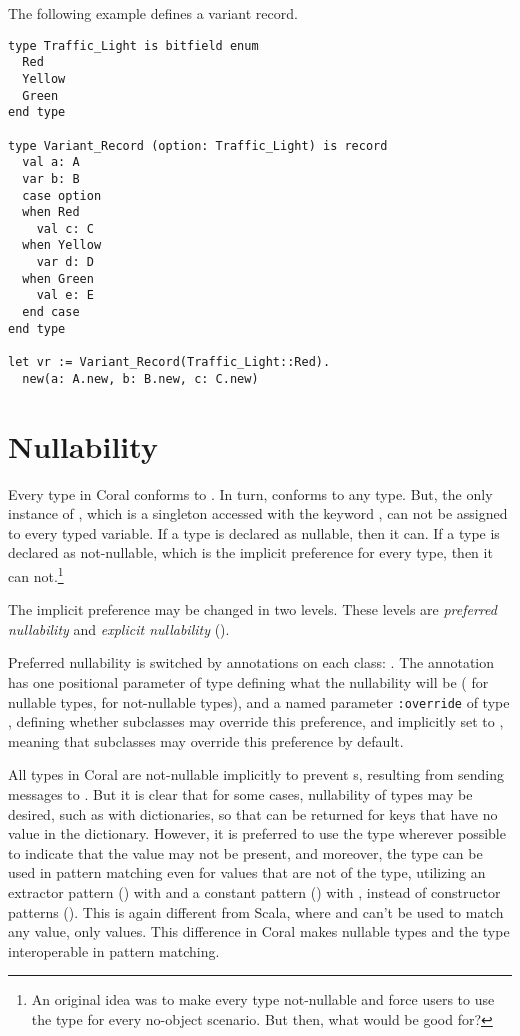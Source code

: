 \example The following example defines a variant record. 
\begin{lstlisting}
type Traffic_Light is bitfield enum
  Red
  Yellow
  Green
end type

type Variant_Record (option: Traffic_Light) is record
  val a: A
  var b: B
  case option
  when Red
    val c: C
  when Yellow
    var d: D
  when Green
    val e: E
  end case
end type

let vr := Variant_Record(Traffic_Light::Red).
  new(a: A.new, b: B.new, c: C.new)
\end{lstlisting}

\section{Nullability}
\label{sec:nullability}

Every type in Coral conforms to . In turn,  conforms to any type. But, the only instance of , which is a singleton accessed with the keyword , can not be assigned to every typed variable. If a type is declared as nullable, then it can. If a type is declared as not-nullable, which is the implicit preference for every type, then it can not.\footnote{An original idea was to make every type not-nullable and force users to use the  type for every no-object scenario. But then, what would  be good for?}

The implicit preference may be changed in two levels. These levels are {\em preferred nullability} and {\em explicit nullability} (). 

Preferred nullability is switched by annotations on each class: . The annotation has one positional parameter of type  defining what the nullability will be ( for nullable types,  for not-nullable types), and a named parameter \lstinline[deletekeywords={override}]!:override! of type , defining whether subclasses may override this preference, and implicitly set to , meaning that subclasses may override this preference by default. 

All types in Coral are not-nullable implicitly to prevent s, resulting from sending messages to . But it is clear that for some cases, nullability of types may be desired, such as with dictionaries, so that  can be returned for keys that have no value in the dictionary. However, it is preferred to use the  type wherever possible to indicate that the value may not be present, and moreover, the  type can be used in pattern matching even for values that are not of the  type, utilizing an extractor pattern () with  and a constant pattern () with , instead of constructor patterns (). This is again different from Scala, where  and  can't be used to match any value, only  values. This difference in Coral makes nullable types and the  type interoperable in pattern matching. 


